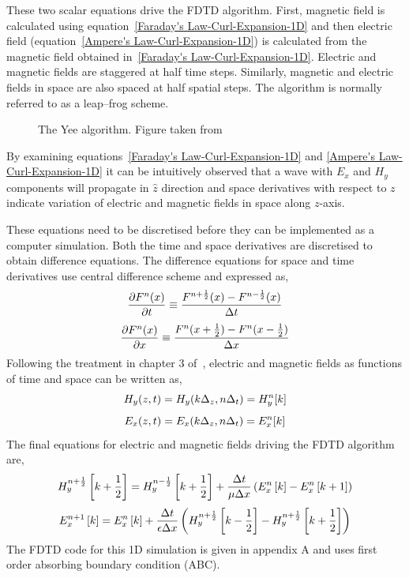 These two scalar equations drive the FDTD algorithm. First, magnetic field is calculated using equation~\ref{Faraday's Law-Curl-Expansion-1D} and then electric field (equation~\ref{Ampere's Law-Curl-Expansion-1D}) is calculated from the magnetic field obtained in~\ref{Faraday's Law-Curl-Expansion-1D}. Electric and magnetic fields are staggered at half time steps. Similarly, magnetic and electric fields in space are also spaced at half spatial steps. The algorithm is normally referred to as a leap--frog scheme.
\begin{figure}[here]
\centering
\caption{The Yee algorithm. Figure taken from~\cite{JBSchneiderUFDTD}}
\label{Algorithm}
\end{figure}
By examining equations~\ref{Faraday's Law-Curl-Expansion-1D} and \ref{Ampere's Law-Curl-Expansion-1D} it can be intuitively observed that a wave with $E_x$ and $H_y$ components will propagate in $\hat{z}$ direction and space derivatives with respect to $z$ indicate variation of electric and magnetic fields in space along $z$-axis.

These equations need to be discretised before they can be implemented as a computer simulation. Both the time and space derivatives are discretised to obtain difference equations. The difference equations for space and time derivatives use central difference scheme and expressed as,
\begin{equation}
\centering
\dfrac{\partial F^n(x)}{\partial t} \equiv \dfrac{F^{n+\frac{1}{2}}(x)-F^{n-\frac{1}{2}}(x)}{\Delta t}
\label{central-difference-time}
\end{equation}
\begin{equation}
\centering
\dfrac{\partial F^n(x)}{\partial x} \equiv \dfrac{F^n(x+\frac{1}{2})-F^n(x-\frac{1}{2})}{\Delta x}
\label{central-difference-space}
\end{equation}
Following the treatment in chapter 3 of~\cite{JBSchneiderUFDTD}, electric and magnetic fields as functions of time and space can be written as,
\begin{equation}
\centering
H_y (z,t)=H_y (k\Delta _z,n\Delta _t)=H^n_y[k]
\label{Hy-of-z_and_t}
\end{equation}
\begin{equation}
\centering
E_x (z,t)=E_x (k\Delta _z,n\Delta _t)=E^n_x[k]
\label{Ex-of-z_and_t}
\end{equation}
The final equations for electric and magnetic fields driving the FDTD algorithm are,
\begin{equation}
\centering
H^{n+\frac{1}{2}}_y \left[k+\frac{1}{2}\right]=H^{n-\frac{1}{2}}_y \left[k+\frac{1}{2}\right] + \dfrac{\Delta t}{\mu \Delta x} \left( E^{n}_x \left[k\right] - E^{n}_x \left[k+1\right] \right)
\label{Hy-1D-Simple-FDTD-Driver}
\end{equation}
\begin{equation}
\centering
E^{n+1}_x \left[k\right]=E^{n}_x \left[k\right] + \dfrac{\Delta t}{\epsilon \Delta x} \left( H^{n+\frac{1}{2}}_y \left[k-\frac{1}{2}\right] - H^{n+\frac{1}{2}}_y \left[k+\frac{1}{2}\right] \right)
\label{Ex-1D-Simple-FDTD-Driver}
\end{equation}
The FDTD code for this 1D simulation is given in appendix A and uses first order absorbing boundary condition (ABC).
